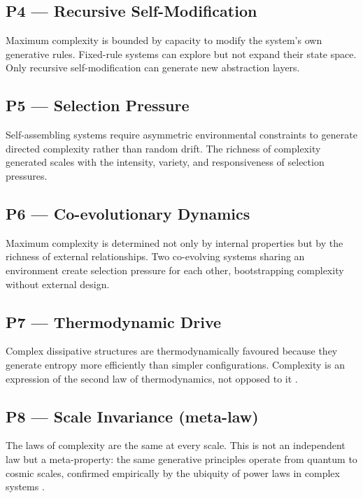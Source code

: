 \documentclass[12pt,a4paper]{article}
\begin{document}
\subsection{P4 --- Recursive Self-Modification}

Maximum complexity is bounded by capacity to modify the system's own
generative rules.
Fixed-rule systems can explore but not expand their state space.
Only recursive self-modification can generate new abstraction layers.

\subsection{P5 --- Selection Pressure}

Self-assembling systems require asymmetric environmental constraints to
generate directed complexity rather than random drift.
The richness of complexity generated scales with the intensity, variety,
and responsiveness of selection pressures.

\subsection{P6 --- Co-evolutionary Dynamics}

Maximum complexity is determined not only by internal properties but by the
richness of external relationships.
Two co-evolving systems sharing an environment create selection pressure for
each other, bootstrapping complexity without external design.

\subsection{P7 --- Thermodynamic Drive}

Complex dissipative structures \citep{prigogine1977} are thermodynamically
favoured because they generate entropy more efficiently than simpler
configurations.
Complexity is an expression of the second law of thermodynamics, not
opposed to it \citep{england2013}.

\subsection{P8 --- Scale Invariance (meta-law)}

The laws of complexity are the same at every scale.
This is not an independent law but a meta-property: the same generative
principles operate from quantum to cosmic scales, confirmed empirically by
the ubiquity of power laws in complex systems \citep{bak1987}.
\end{document}
